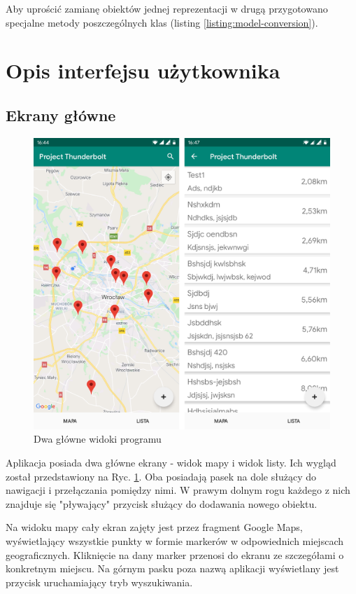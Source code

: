 \documentclass[polish,polish,a4paper,12pt]{article}
\let\sectioncmd\section
\renewcommand{\section}{\clearpage\sectioncmd}
\begin{document}
	Aby uprościć zamianę obiektów jednej reprezentacji w drugą przygotowano specjalne metody poszczególnych klas (listing \ref{listing:model-conversion}).

\section{Opis interfejsu użytkownika}\label{ui}
	\subsection{Ekrany główne}

	\begin{figure}[H]
		\centering
		\includegraphics[width = \textwidth]{screenshot-main}
		\caption{Dwa główne widoki programu}
		\label{fig:screenshot-main}
	\end{figure}

	Aplikacja posiada dwa główne ekrany - widok mapy i widok listy. Ich wygląd został przedstawiony na Ryc. \ref{fig:screenshot-main}. Oba posiadają pasek na dole służący do nawigacji i przełączania pomiędzy nimi. W prawym dolnym rogu każdego z nich znajduje się "pływający" przycisk służący do dodawania nowego obiektu.

	Na widoku mapy cały ekran zajęty jest przez fragment Google Maps, wyświetlający wszystkie punkty w formie markerów w odpowiednich miejscach geograficznych. Kliknięcie na dany marker przenosi do ekranu ze szczegółami o konkretnym miejscu. Na górnym pasku poza nazwą aplikacji wyświetlany jest przycisk uruchamiający tryb wyszukiwania.
\end{document}

